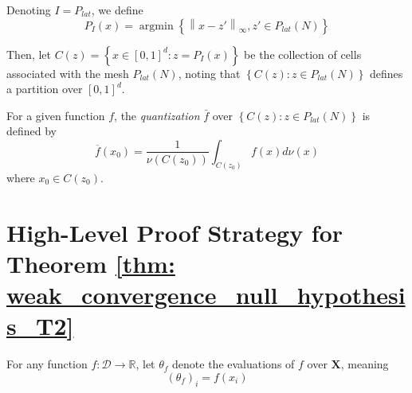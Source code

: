 \documentclass{article}
\newcommand{\Reals}{\mathbb{R}}
\newcommand{\norm}[1]{\left\lVert#1\right\rVert}
\newcommand{\set}[1]{\left\{#1\right\}}
\DeclareMathOperator*{\argmin}{argmin}
\newcommand{\Xbf}{\mathbf{X}}
\newcommand{\Dset}{\mathcal{D}}
\newcommand{\1}{\mathbf{1}}
\theoremstyle{alden}
\theoremstyle{aldenthm}
\theoremstyle{remark}
\begin{document}
Denoting $I = P_{lat}$, we define
\begin{equation*}
P_I(x) = \argmin \set{\norm{x - z'}_{\infty}, z' \in P_{lat}(N)}
\end{equation*}

Then, let $C(z) = \set{x \in [0,1]^d: z =  P_I(x)}$ be the collection of cells associated with the mesh $P_{lat}(N)$, noting that $\set{C(z): z \in P_{lat}(N)}$ defines a partition over $[0,1]^d$.

For a given function $f$, the \emph{quantization} $\bar{f}$ over $\set{C(z): z \in P_{lat}(N)}$ is defined by
\begin{equation*}
\overline{f}(x_0) = \frac{1}{\nu(C(z_0))} \int_{C(z_0)} f(x) d \nu(x)
\end{equation*}
where $x_0 \in C(z_0)$. 


\section{High-Level Proof Strategy for Theorem \ref{thm: weak_convergence_null_hypothesis_T2}}

For any function $f:\Dset \to \Reals$, let $\theta_{f}$ denote the evaluations of $f$ over $\Xbf$, meaning
\begin{equation*}
(\theta_f)_i = f(x_i)
\end{equation*}
\end{document}
